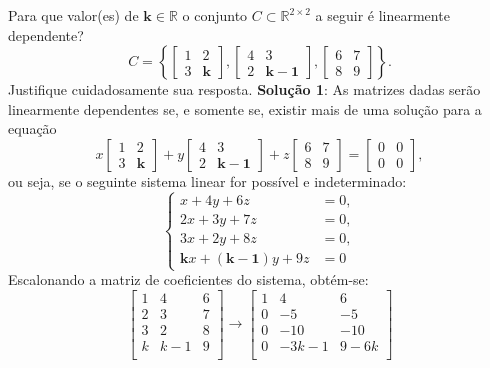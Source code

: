 \documentclass[12pt,a4paper]{article}
\newcommand*\R{\mathbb{R}}
\begin{document}
\begin{ExerciseList}
\Exercise[title={2,0}] Para que valor(es) de $\mathbf{k} \in \R$ o conjunto $C \subset \R^{2 \times 2}$ a seguir é linearmente dependente?
\[
C = \left\{
\begin{bmatrix}
1 & 2 \\ 3 & \mathbf{k}
\end{bmatrix},
\begin{bmatrix}
4 & 3 \\ 2 & \mathbf{k-1}
\end{bmatrix},
\begin{bmatrix}
6 & 7 \\ 8 & 9
\end{bmatrix}
\right\}.
\]
Justifique cuidadosamente sua resposta.
\Answer \textbf{Solução 1}: As matrizes dadas serão linearmente dependentes se, e somente se, existir mais de uma solução para a equação
\[
x
\begin{bmatrix}
1 & 2 \\ 3 & \mathbf{k}
\end{bmatrix}
+y
\begin{bmatrix}
4 & 3 \\ 2 & \mathbf{k-1}
\end{bmatrix}
+z
\begin{bmatrix}
6 & 7 \\ 8 & 9
\end{bmatrix}
=
\begin{bmatrix}
0 & 0 \\ 0 & 0
\end{bmatrix},
\]
ou seja, se o seguinte sistema linear for possível e indeterminado:
\[
\begin{cases}
x +4y+6z &=0,\\
2x+3y+7z &=0,\\
3x+2y+8z &=0,\\
\mathbf{k}x+(\mathbf{k-1})y+9z &=0
\end{cases}
\]
Escalonando a matriz de coeficientes do sistema, obtém-se:
\[
\begin{bmatrix}
1 & 4 & 6\\
2 & 3 & 7\\
3 & 2 & 8\\
k & k-1 & 9\\
\end{bmatrix}
\rightarrow
\begin{bmatrix}
1 & 4 & 6\\
0 & -5 & -5\\
0 & -10 & -10\\
0 & -3k-1 & 9-6k\\

\end{bmatrix}\]
\end{ExerciseList}
\end{document}

